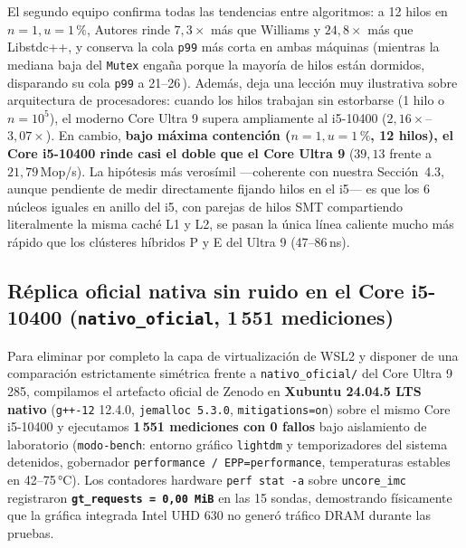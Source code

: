 \documentclass[11pt,a4paper]{article}
\newcommand{\us}{\,\text{\textmu s}}
\begin{document}
El segundo equipo confirma todas las tendencias entre algoritmos: a 12 hilos en $n=1, u=1\,\%$, Autores rinde $7,3\times$ más que Williams y $24,8\times$ más que Libstdc++, y conserva la cola \texttt{p99} más corta en ambas máquinas (mientras la mediana baja del \texttt{Mutex} engaña porque la mayoría de hilos están dormidos, disparando su cola \texttt{p99} a 21--26\us{}). Además, deja una lección muy ilustrativa sobre arquitectura de procesadores: cuando los hilos trabajan sin estorbarse (1 hilo o $n=10^5$), el moderno Core Ultra 9 supera ampliamente al i5-10400 ($2,16\times$--$3,07\times$). En cambio, \textbf{bajo máxima contención ($n=1, u=1\,\%$, 12 hilos), el Core i5-10400 rinde casi el doble que el Core Ultra 9} ($39,13$ frente a $21,79$\,Mop/s). La hipótesis más verosímil —coherente con nuestra Sección~4.3, aunque pendiente de medir directamente fijando hilos en el i5— es que los 6 núcleos iguales en anillo del i5, con parejas de hilos SMT compartiendo literalmente la misma caché L1 y L2, se pasan la única línea caliente mucho más rápido que los clústeres híbridos P y E del Ultra 9 (47--86\,ns).


\subsection{Réplica oficial nativa sin ruido en el Core i5-10400 (\texttt{nativo\_oficial}, 1\,551 mediciones)}
Para eliminar por completo la capa de virtualización de WSL2 y disponer de una comparación estrictamente simétrica frente a \texttt{nativo\_oficial/} del Core Ultra 9 285, compilamos el artefacto oficial de Zenodo en \textbf{Xubuntu 24.04.5 LTS nativo} (\texttt{g++-12} 12.4.0, \texttt{jemalloc 5.3.0}, \texttt{mitigations=on}) sobre el mismo Core i5-10400 y ejecutamos \textbf{1\,551 mediciones con 0 fallos} bajo aislamiento de laboratorio (\texttt{modo-bench}: entorno gráfico \texttt{lightdm} y temporizadores del sistema detenidos, gobernador \texttt{performance / EPP=performance}, temperaturas estables en 42--75\,°C). Los contadores hardware \texttt{perf stat -a} sobre \texttt{uncore\_imc} registraron \textbf{\texttt{gt\_requests = 0,00\,MiB}} en las 15 sondas, demostrando físicamente que la gráfica integrada Intel UHD 630 no generó tráfico DRAM durante las pruebas.
\end{document}
